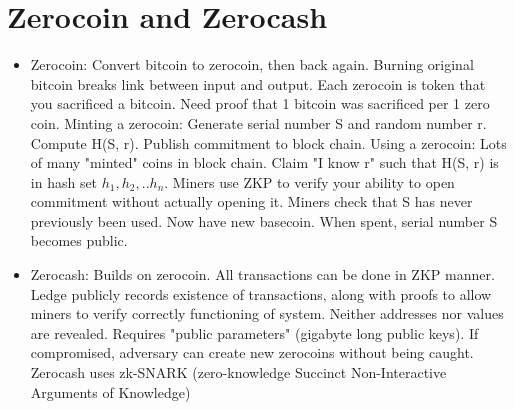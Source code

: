 \documentclass{article}
\begin{document}
\section{Zerocoin and Zerocash}
\begin{itemize}
\item Zerocoin: Convert bitcoin to zerocoin, then back again. Burning original bitcoin breaks link between input and output. Each zerocoin is token that you sacrificed a bitcoin. Need proof that 1 bitcoin was sacrificed per 1 zero coin.
\subitem Minting a zerocoin: Generate serial number S and random number r. Compute H(S, r). Publish commitment to block chain.
\subitem Using a zerocoin: Lots of many "minted" coins in block chain. Claim "I know r" such that H(S, r) is in hash set $h_1, h_2, ..h_n$. Miners use ZKP to verify your ability to open commitment without actually opening it. Miners check that S has never previously been used. Now have new basecoin. When spent, serial number S becomes public.
\item Zerocash: Builds on zerocoin. All transactions can be done in ZKP manner. Ledge publicly records existence of transactions, along with proofs to allow miners to verify correctly functioning of system. Neither addresses nor values are revealed.
\subitem Requires "public parameters" (gigabyte long public keys). If compromised, adversary can create new zerocoins without being caught.
\subitem Zerocash uses zk-SNARK (zero-knowledge Succinct Non-Interactive Arguments of Knowledge)
\end{itemize}
\end{document}
